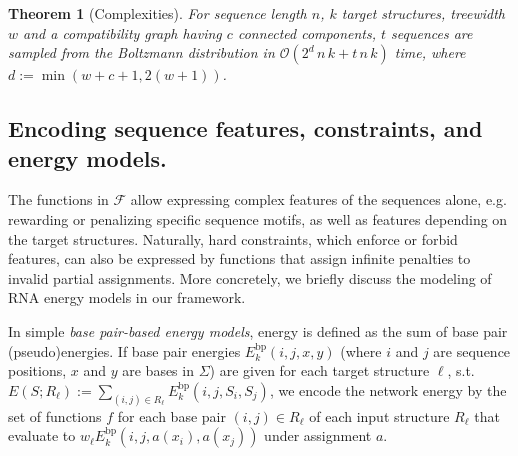 \documentclass{bioinfo}
\newtheorem{theorem}{Theorem}
\newcommand{\network}{\mathcal{N}}
\newcommand{\val}{a} %
\newcommand{\energy}[1]{\operatorname{e}_{#1}}
\newcommand{\F}{\mathcal{F}}
\newcommand{\Ebp}[2]{E^{\textrm{bp}}_{#1}(#2)}
\newcommand{\Ehp}[1]{E^{\textrm{hp}}(#1)}
\newcommand{\Eint}[1]{E^{\textrm{int}}(#1)}
\newcommand{\Def}[1]{{\it #1}}
\begin{document}
\begin{theorem}[Complexities]
  For sequence length $n$, $k$ target structures, treewidth $w$ and
  a compatibility graph having $c$ connected components, $t$ sequences
  are sampled from the Boltzmann distribution  in
  $\mathcal{O}( 2^d\, n\, k  + t\, n\, k )$ time, where $d:=\min(w+c+1,2(w+1))$.
\end{theorem}

\subsection{Encoding sequence features, constraints, and energy
  models.}\label{sec:energy_models}

The functions in $\F$ allow expressing complex features of the
sequences alone, e.g. rewarding or penalizing specific sequence
motifs, as well as features depending on the target structures.
Naturally, hard
constraints, which enforce or forbid features, can also be expressed by functions that
assign infinite penalties to invalid partial assignments. More concretely, we briefly 
discuss the modeling of RNA energy models in our
framework.

In simple \Def{base pair-based energy models}, energy is defined as the sum of base pair (pseudo)energies. If base pair energies $\Ebp{k}{i,j,x,y}$ (where
$i$ and $j$ are sequence positions, $x$ and $y$ are bases in $\Sigma$)
are given for each target structure $\ell$, s.t.
$ E(S;R_\ell) := \sum_{(i,j)\in R_\ell} \Ebp{k}{i,j,S_i,S_j}$, we
encode the network energy by the set of functions
$f$ for each base pair $(i,j)\in R_\ell$ of each input structure
$R_\ell$ that evaluate to $w_\ell \Ebp{k}{i,j,\val(x_i),\val(x_j)}$
under assignment $\val$.

\end{document}
